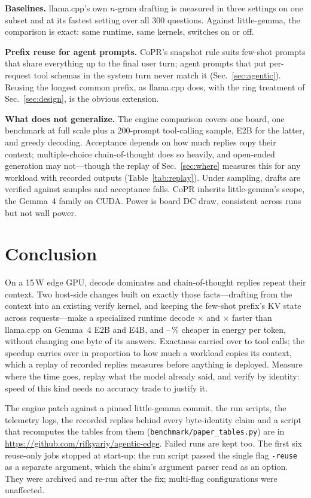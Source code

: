 \documentclass[conference]{IEEEtran}
\newcommand{\sys}{CoPR}
\newcommand{\lc}{llama.cpp}
\newcommand{\lgm}{little-gemma}
\begin{document}
\textbf{Baselines.} \lc{}'s own $n$-gram drafting is measured in three
settings on one subset and at its fastest setting over all 300 questions.
Against \lgm{}, the comparison is exact: same runtime, same kernels, switches
on or off.

\textbf{Prefix reuse for agent prompts.} \sys{}'s snapshot rule suits
few-shot prompts that share everything up to the final user turn; agent
prompts that put per-request tool schemas in the system turn never match it
(Sec.~\ref{sec:agentic}). Reusing the longest common prefix, as \lc{} does,
with the ring treatment of Sec.~\ref{sec:design}, is the obvious extension.

\textbf{What does not generalize.} The engine comparison covers one board,
one benchmark at full scale plus a 200-prompt tool-calling sample, E2B for the
latter, and greedy decoding. Acceptance depends on how much replies copy their context;
multiple-choice chain-of-thought does so heavily, and open-ended generation may
not---though the replay of Sec.~\ref{sec:where} measures this for any workload
with recorded outputs (Table~\ref{tab:replay}). Under sampling, drafts are verified against samples and
acceptance falls. \sys{} inherits \lgm{}'s scope, the Gemma~4 family on CUDA.
Power is board DC draw, consistent across runs but not wall power.

\section{Conclusion}
On a 15\,W edge GPU, decode dominates and chain-of-thought replies repeat
their context. Two host-side changes built on exactly those facts---drafting
from the context into an existing verify kernel, and keeping the few-shot
prefix's KV state across requests---make a specialized runtime decode
\EtwoSpL$\times$ and \EfourSpL$\times$ faster than \lc{} on Gemma~4 E2B and E4B,
and \EtwoJsav--\EfourJsav\,\% cheaper in energy per token, without changing one
byte of its answers. Exactness carried over to tool calls; the speedup carries
over in proportion to how much a workload copies its context, which a replay of
recorded replies measures before anything is deployed. Measure where the time
goes, replay what the model already said, and verify by identity: speed of this
kind needs no accuracy trade to justify it.

\appendix[Reproducibility]
The engine patch against a pinned \lgm{} commit, the run scripts, the telemetry
logs, the recorded replies behind every byte-identity claim and a script that
recomputes the tables from them (\texttt{benchmark/paper\_tables.py}) are in
\url{https://github.com/rifkyariy/agentic-edge}.
Failed runs are kept too. The first six reuse-only jobs stopped at start-up: the
run script passed the single flag \texttt{-reuse} as a separate argument, which
the shim's argument parser read as an option. They were archived and re-run
after the fix; multi-flag configurations were unaffected.



\end{document}
